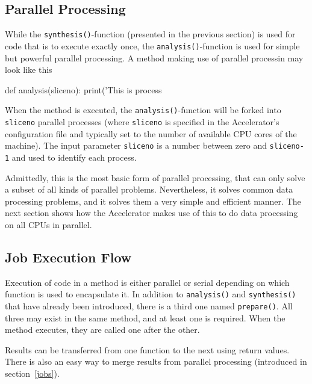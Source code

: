 \subsection{Parallel Processing}

While the \texttt{synthesis()}-function (presented in the previous
section) is used for code that is to execute exactly once, the
\texttt{analysis()}-function is used for simple but powerful parallel
processing.  A method making use of parallel processin may look like
this
\begin{python}
def analysis(sliceno):
    print('This is process %
\end{python}
When the method is executed, the \texttt{analysis()}-function will be
forked into \texttt{sliceno} parallel processes (where
\texttt{sliceno} is specified in the Accelerator's configuration file
and typically set to the number of available CPU cores of the
machine).  The input parameter \texttt{sliceno} is a number between
zero and \texttt{sliceno-1} and used to identify each process.

Admittedly, this is the most basic form of parallel processing, that
can only solve a subset of all kinds of parallel problems.
Nevertheless, it solves common data processing problems, and it solves
them a very simple and efficient manner.  The next section shows how
the Accelerator makes use of this to do data processing on all CPUs in
parallel.


\subsection{Job Execution Flow}

Execution of code in a method is either parallel or serial depending
on which function is used to encapsulate it.  In addition to
\texttt{analysis()} and \texttt{synthesis()} that have already been
introduced, there is a third one named \texttt{prepare()}.  All three
may exist in the same method, and at least one is required.  When the
method executes, they are called one after the other.

Results can be transferred from one function to the next using return
values.  There is also an easy way to merge results from parallel
processing (introduced in section~\ref{jobs}).

